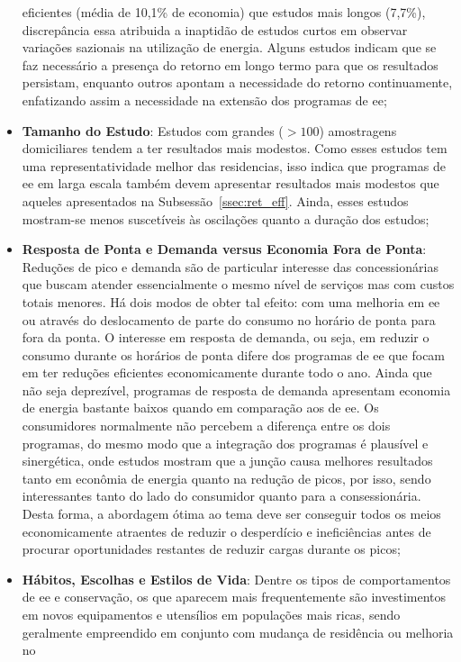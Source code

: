 \begin{itemize}
eficientes (média de 10,1\% de economia) que estudos mais longos (7,7\%),
discrepância essa atribuida a inaptidão de estudos curtos em observar variações
sazionais na utilização de energia. Alguns estudos indicam que se faz necessário 
a presença do retorno em longo termo para que os resultados persistam, 
enquanto outros apontam a necessidade do retorno continuamente, enfatizando
assim a necessidade na extensão dos programas de \gls{ee};
\item \textbf{Tamanho do Estudo}: Estudos com grandes ($> 100$) amostragens
domiciliares tendem a ter resultados mais modestos. Como esses estudos tem uma
representatividade melhor das residencias, isso indica que programas de
\gls{ee} em larga escala também devem apresentar resultados mais modestos que
aqueles apresentados na Subsessão~\ref{ssec:ret_eff}.
Ainda, esses estudos mostram-se menos suscetíveis às oscilações 
quanto a duração dos estudos;
\item \textbf{Resposta de Ponta e Demanda versus Economia Fora de Ponta}:
Reduções de pico e demanda são de particular interesse das concessionárias que
buscam atender essencialmente o mesmo nível de serviços mas com custos totais
menores. Há dois modos de obter tal efeito: com uma melhoria em \gls{ee} ou
através do deslocamento de parte do consumo no horário de ponta para fora da
ponta. O interesse em resposta de demanda, ou seja, em reduzir o
consumo durante os horários de ponta difere dos programas de \gls{ee} que focam
em ter reduções eficientes economicamente durante todo o ano. Ainda que não seja
deprezível, programas de resposta de demanda apresentam economia de energia
bastante baixos quando em comparação aos de \gls{ee}. Os consumidores
normalmente não percebem a diferença entre os dois programas, do mesmo modo 
que a integração dos programas é plausível e sinergética, 
onde estudos mostram que a junção causa melhores resultados tanto 
em econômia de energia quanto na 
redução de picos, por isso, sendo interessantes tanto do lado do consumidor 
quanto para a consessionária. Desta forma, a abordagem ótima ao tema deve
ser conseguir todos os meios economicamente atraentes de reduzir o desperdício 
e ineficiências antes de procurar oportunidades restantes de reduzir cargas 
durante os picos;
\item \textbf{Hábitos, Escolhas e Estilos de Vida}: Dentre os tipos de
comportamentos de \gls{ee} e conservação, os que aparecem mais frequentemente são 
investimentos em novos equipamentos e utensílios em populações mais ricas, sendo
geralmente empreendido em conjunto com mudança de residência ou melhoria no

\end{itemize}
